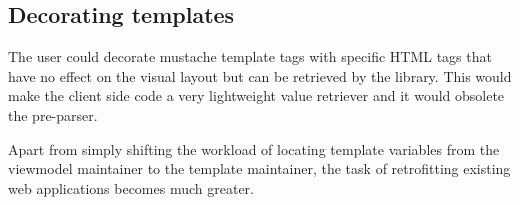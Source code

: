 \documentclass[thesis.tex]{subfiles}
\begin{document}
\subsection{Decorating templates}

The user could decorate mustache template tags with specific HTML tags that
have no effect on the visual layout but can be retrieved by the library.
This would make the client side code a very lightweight value retriever
and it would obsolete the pre-parser.

Apart from simply shifting the workload of locating template variables
from the viewmodel maintainer to the template maintainer, the task of
retrofitting existing web applications becomes much greater.
\end{document}
